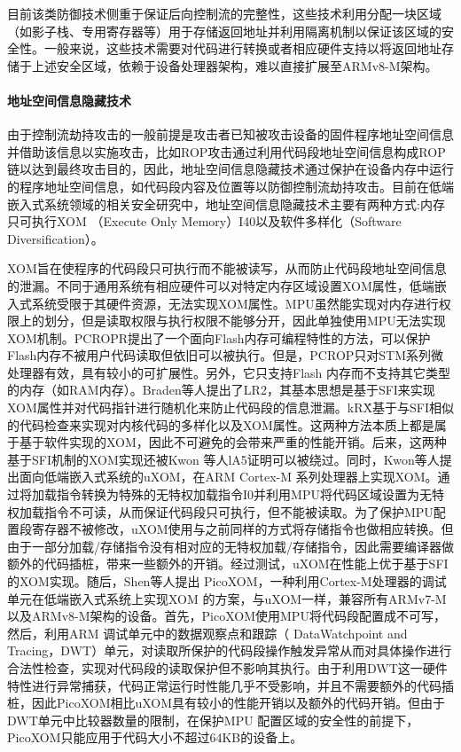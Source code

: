 \documentclass[12pt,a4paper]{ctexart}
\begin{document}
\par 目前该类防御技术侧重于保证后向控制流的完整性，这些技术利用分配一块区域（如影子栈、专用寄存器等）用于存储返回地址并利用隔离机制以保证该区域的安全性。一般来说，这些技术需要对代码进行转换或者相应硬件支持以将返回地址存储于上述安全区域，依赖于设备处理器架构，难以直接扩展至ARMv8-M架构。
\paragraph{地址空间信息隐藏技术}
\par 由于控制流劫持攻击的一般前提是攻击者已知被攻击设备的固件程序地址空间信息并借助该信息以实施攻击，比如ROP攻击通过利用代码段地址空间信息构成ROP链以达到最终攻击目的，因此，地址空间信息隐藏技术通过保护在设备内存中运行的程序地址空间信息，如代码段内容及位置等以防御控制流劫持攻击。目前在低端嵌入式系统领域的相关安全研究中，地址空间信息隐藏技术主要有两种方式:内存只可执行XOM （Execute Only Memory）I40以及软件多样化（Software Diversification）。
\par XOM旨在使程序的代码段只可执行而不能被读写，从而防止代码段地址空间信息的泄漏。不同于通用系统有相应硬件可以对特定内存区域设置XOM属性，低端嵌入式系统受限于其硬件资源，无法实现XOM属性。MPU虽然能实现对内存进行权限上的划分，但是读取权限与执行权限不能够分开，因此单独使用MPU无法实现XOM机制。PCROPR提出了一个面向Flash内存可编程特性的方法，可以保护Flash内存不被用户代码读取但依旧可以被执行。但是，PCROP只对STM系列微处理器有效，具有较小的可扩展性。另外，它只支持Flash 内存而不支持其它类型的内存（如RAM内存）。Braden等人提出了LR2，其基本思想是基于SFI来实现XOM属性并对代码指针进行随机化来防止代码段的信息泄漏。kR\^X基于与SFI相似的代码检查来实现对内核代码的多样化以及XOM属性。这两种方法本质上都是属于基于软件实现的XOM，因此不可避免的会带来严重的性能开销。后来，这两种基于SFI机制的XOM实现还被Kwon 等人lA5证明可以被绕过。同时，Kwon等人提出面向低端嵌入式系统的uXOM，在ARM Cortex-M 系列处理器上实现XOM。通过将加载指令转换为特殊的无特权加载指令I0并利用MPU将代码区域设置为无特权加载指令不可读，从而保证代码段只可执行，但不能被读取。为了保护MPU配置段寄存器不被修改，uXOM使用与之前同样的方式将存储指令也做相应转换。但由于一部分加载/存储指令没有相对应的无特权加载/存储指令，因此需要编译器做额外的代码插桩，带来一些额外的开销。经过测试，uXOM在性能上优于基于SFI的XOM实现。随后，Shen等人提出 PicoXOM，一种利用Cortex-M处理器的调试单元在低端嵌入式系统上实现XOM 的方案，与uXOM一样，兼容所有ARMv7-M 以及ARMv8-M架构的设备。首先，PicoXOM使用MPU将代码段配置成不可写，然后，利用ARM 调试单元中的数据观察点和跟踪（ DataWatchpoint and Tracing，DWT）单元，对读取所保护的代码段操作触发异常从而对具体操作进行合法性检查，实现对代码段的读取保护但不影响其执行。由于利用DWT这一硬件特性进行异常捕获，代码正常运行时性能几乎不受影响，并且不需要额外的代码插桩，因此PicoXOM相比uXOM具有较小的性能开销以及额外的代码开销。但由于DWT单元中比较器数量的限制，在保护MPU 配置区域的安全性的前提下，PicoXOM只能应用于代码大小不超过64KB的设备上。
\end{document}
